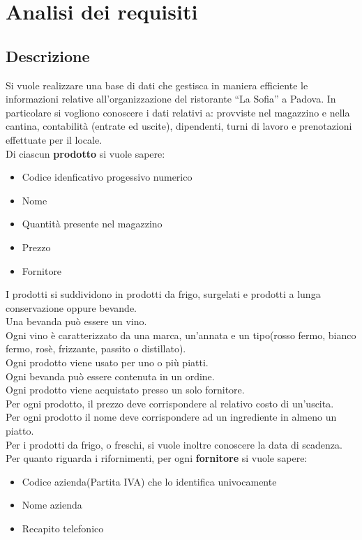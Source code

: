 \section{Analisi dei requisiti} 
\subsection{Descrizione}
Si vuole realizzare una base di dati che gestisca in maniera efficiente le informazioni relative all’organizzazione del ristorante “La Sofia” a Padova. In particolare si vogliono conoscere i dati relativi a: provviste nel magazzino e nella cantina, contabilità (entrate ed uscite), dipendenti, turni di lavoro e prenotazioni effettuate per il locale. \medskip \\
Di ciascun \textbf{prodotto} si vuole sapere:
\begin{itemize}
    \item Codice idenficativo progessivo numerico
    \item Nome
    \item Quantità presente nel magazzino
    \item Prezzo
    \item Fornitore
\end{itemize}
I prodotti si suddividono in prodotti da frigo, surgelati e prodotti a lunga conservazione oppure bevande. \\
Una bevanda può essere un vino. \\
Ogni vino è caratterizzato da una marca, un'annata e un tipo(rosso fermo, bianco fermo, rosè, frizzante, passito o distillato). \\
Ogni prodotto viene usato per uno o più piatti. \\
Ogni bevanda può essere contenuta in un ordine. \\
Ogni prodotto viene acquistato presso un solo fornitore.\\
Per ogni prodotto, il prezzo deve corrispondere al relativo costo di un'uscita. \\
Per ogni prodotto il nome deve corrispondere ad un ingrediente in almeno un piatto. \\
Per i prodotti da frigo, o freschi, si vuole inoltre conoscere la data di scadenza. \medskip \\
Per quanto riguarda i rifornimenti, per ogni \textbf{fornitore} si vuole sapere:
\begin{itemize}
    \item Codice azienda(Partita IVA) che lo identifica univocamente
    \item Nome azienda
    \item Recapito telefonico
\end{itemize}
